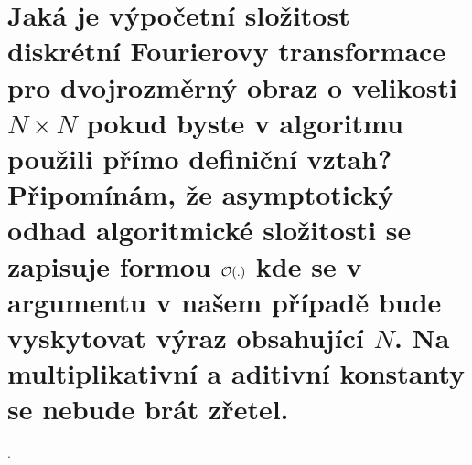 \section{Jaká je výpočetní složitost diskrétní Fourierovy transformace pro dvojrozměrný obraz o velikosti 
\texorpdfstring{$N \times N$}{N x N} pokud byste v algoritmu použili přímo definiční vztah? Připomínám, že asymptotický 
odhad algoritmické složitosti se zapisuje formou \texorpdfstring{$\mathcal{O}(.)$}{O(.)} kde se v argumentu v našem případě bude 
vyskytovat výraz obsahující \texorpdfstring{$N$}{N}. Na multiplikativní a aditivní konstanty se nebude brát zřetel.}.